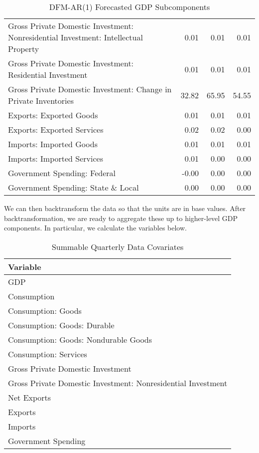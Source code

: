 \documentclass[11pt, letterpaper]{article}\usepackage[]{graphicx}\usepackage[]{color}
\begin{document}
\begin{table}[H]
\begin{tabular}{lrrr}
  Gross Private Domestic Investment: Nonresidential Investment: Intellectual Property & 0.01 & 0.01 & 0.01 \\ 
  Gross Private Domestic Investment: Residential Investment & 0.01 & 0.01 & 0.01 \\ 
  Gross Private Domestic Investment: Change in Private Inventories & 32.82 & 65.95 & 54.55 \\ 
  Exports: Exported Goods & 0.01 & 0.01 & 0.01 \\ 
  Exports: Exported Services & 0.02 & 0.02 & 0.00 \\ 
  Imports: Imported Goods & 0.01 & 0.01 & 0.01 \\ 
  Imports: Imported Services & 0.01 & 0.00 & 0.00 \\ 
  Government Spending: Federal & -0.00 & 0.00 & 0.00 \\ 
  Government Spending: State \& Local & 0.00 & 0.00 & 0.00 \\ 
   \hline
\end{tabular}
\endgroup
\caption{DFM-AR(1) Forecasted GDP Subcomponents} 
\end{table}


We can then backtransform the data so that the units are in base values. After backtransformation, we are ready to aggregate these up to higher-level GDP components. In particular, we calculate the variables below.
\begin{table}[H]
\centering
\begingroup\scriptsize
\begin{tabular}{l}
  \hline
Variable \\ 
  \hline
GDP \\ 
  Consumption \\ 
  Consumption: Goods \\ 
  Consumption: Goods: Durable \\ 
  Consumption: Goods: Nondurable Goods \\ 
  Consumption: Services \\ 
  Gross Private Domestic Investment \\ 
  Gross Private Domestic Investment: Nonresidential Investment \\ 
  Net Exports \\ 
  Exports \\ 
  Imports \\ 
  Government Spending \\ 
   \hline
\end{tabular}
\endgroup
\caption{Summable Quarterly Data Covariates} 
\end{table}
\end{document}

